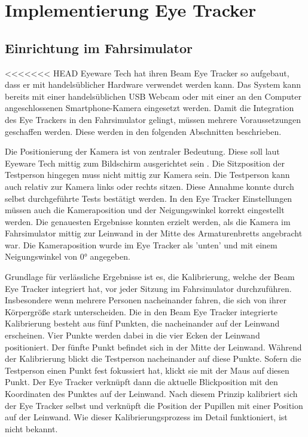 \chapter{Implementierung Eye Tracker}
\label{sec:implementierung eye tracker}

\section{Einrichtung im Fahrsimulator}

<<<<<<< HEAD
Eyeware Tech hat ihren Beam Eye Tracker so aufgebaut, dass er mit handelsüblicher Hardware verwendet werden kann. Das System kann bereits mit einer handelsüblichen {\ac{USB}} Webcam oder mit einer an den Computer angeschlossenen Smartphone-Kamera eingesetzt werden. Damit die Integration des Eye Trackers in den Fahrsimulator gelingt, müssen mehrere Voraussetzungen geschaffen werden. Diese werden in den folgenden Abschnitten beschrieben. 

Die Positionierung der Kamera ist von zentraler Bedeutung. Diese soll laut Eyeware Tech mittig zum Bildschirm ausgerichtet sein \cite{lit_software_beam_eyetracker}. Die Sitzposition der Testperson hingegen muss nicht mittig zur Kamera sein. Die Testperson kann auch relativ zur Kamera links oder rechts sitzen. Diese Annahme konnte durch selbst durchgeführte Tests bestätigt werden. 
In den Eye Tracker Einstellungen müssen auch die Kameraposition und der Neigungswinkel korrekt eingestellt werden. Die genauesten Ergebnisse konnten erzielt werden, als die Kamera im Fahrsimulator mittig zur Leinwand in der Mitte des Armaturenbretts angebracht war. Die Kameraposition wurde im Eye Tracker als 'unten' und mit einem Neigungswinkel von 0° angegeben.

Grundlage für verlässliche Ergebnisse ist es, die Kalibrierung, welche der Beam Eye Tracker integriert hat, vor jeder Sitzung im Fahrsimulator durchzuführen. Insbesondere wenn mehrere Personen nacheinander fahren, die sich von ihrer Körpergröße stark unterscheiden. Die in den Beam Eye Tracker integrierte Kalibrierung besteht aus fünf Punkten, die nacheinander auf der Leinwand erscheinen. Vier Punkte werden dabei in die vier Ecken der Leinwand positioniert. Der fünfte Punkt befindet sich in der Mitte der Leinwand. Während der Kalibrierung blickt die Testperson nacheinander auf diese Punkte. Sofern die Testperson einen Punkt fest fokussiert hat, klickt sie mit der Maus auf diesen Punkt. Der Eye Tracker verknüpft dann die aktuelle Blickposition mit den Koordinaten des Punktes auf der Leinwand. Nach diesem Prinzip kalibriert sich der Eye Tracker selbst und verknüpft die Position der Pupillen mit einer Position auf der Leinwand. Wie dieser Kalibrierungsprozess im Detail funktioniert, ist nicht bekannt.

